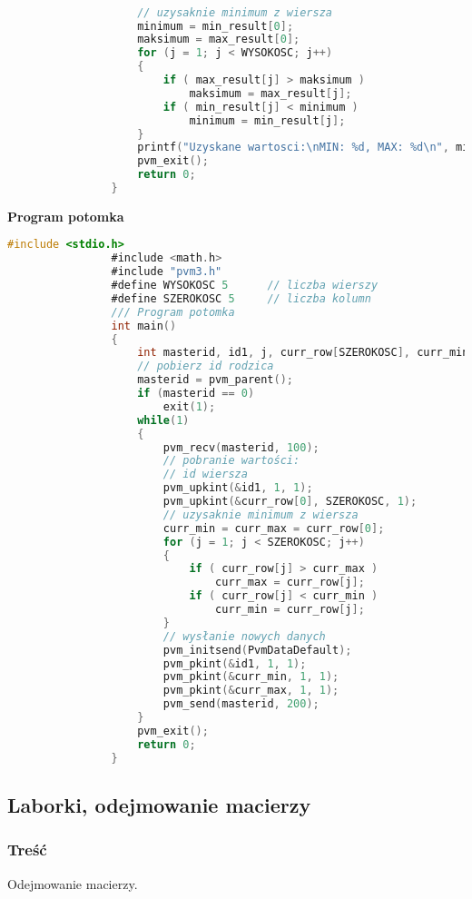 \begin{lstlisting}[language={C}]
					
					
					
					// uzysaknie minimum z wiersza
					minimum = min_result[0];
					maksimum = max_result[0];
					for (j = 1; j < WYSOKOSC; j++)
					{
						if ( max_result[j] > maksimum )
							maksimum = max_result[j];
						if ( min_result[j] < minimum )
							minimum = min_result[j];
					}
					printf("Uzyskane wartosci:\nMIN: %d, MAX: %d\n", minimum, maksimum);
					pvm_exit();
					return 0;
				}
			\end{lstlisting}
			\textbf{Program potomka}
			\begin{lstlisting}[language={C}]
				#include <stdio.h>
				#include <math.h>
				#include "pvm3.h"
				#define WYSOKOSC 5		// liczba wierszy
				#define SZEROKOSC 5		// liczba kolumn
				/// Program potomka
				int main()
				{
					int masterid, id1, j, curr_row[SZEROKOSC], curr_min, curr_max;
					// pobierz id rodzica 
					masterid = pvm_parent();
					if (masterid == 0)
						exit(1);
					while(1)
					{
						pvm_recv(masterid, 100);
						// pobranie wartości:
						// id wiersza
						pvm_upkint(&id1, 1, 1);
						pvm_upkint(&curr_row[0], SZEROKOSC, 1);
						// uzysaknie minimum z wiersza
						curr_min = curr_max = curr_row[0];
						for (j = 1; j < SZEROKOSC; j++)
						{
							if ( curr_row[j] > curr_max )
								curr_max = curr_row[j];
							if ( curr_row[j] < curr_min )
								curr_min = curr_row[j];
						}
						// wysłanie nowych danych
						pvm_initsend(PvmDataDefault);
						pvm_pkint(&id1, 1, 1);
						pvm_pkint(&curr_min, 1, 1);
						pvm_pkint(&curr_max, 1, 1);
						pvm_send(masterid, 200);
					}
					pvm_exit();
					return 0;
				}
			\end{lstlisting}
	\subsection{Laborki, odejmowanie macierzy}
		\subsubsection{Treść}
			Odejmowanie macierzy.
